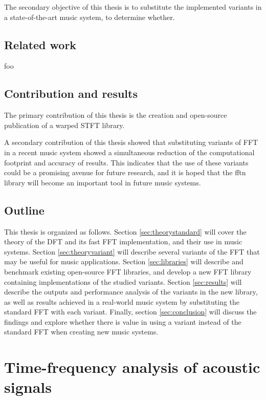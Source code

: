\documentclass[letter,12pt,notitlepage]{article}
\begin{document}
The secondary objective of this thesis is to substitute the implemented variants in a state-of-the-art music system, to determine whether.

\subsection{Related work}

foo

\subsection{Contribution and results}

The primary contribution of this thesis is the creation and open-source publication of a warped STFT library.

A secondary contribution of this thesis showed that substituting variants of FFT in a recent music system  showed a simultaneous reduction of the computational footprint and accuracy of results. This indicates that the use of these variants could be a promising avenue for future research, and it is hoped that the fftn library will become an important tool in future music systems.

\subsection{Outline}

This thesis is organized as follows. Section \ref{sec:theorystandard} will cover the theory of the DFT and its fast FFT implementation, and their use in music systems. Section \ref{sec:theoryvariant} will describe several variants of the FFT that may be useful for music applications. Section \ref{sec:libraries} will describe and benchmark existing open-source FFT libraries, and develop a new FFT library containing implementations of the studied variants. Section \ref{sec:results} will describe the outputs and performance analysis of the variants in the new library, as well as results achieved in a real-world music system by substituting the standard FFT with each variant. Finally, section \ref{sec:conclusion} will discuss the findings and explore whether there is value in using a variant instead of the standard FFT when creating new music systems.

\vfill
\clearpage

\section{Time-frequency analysis of acoustic signals}
\label{sec:theorytf}
\end{document}
